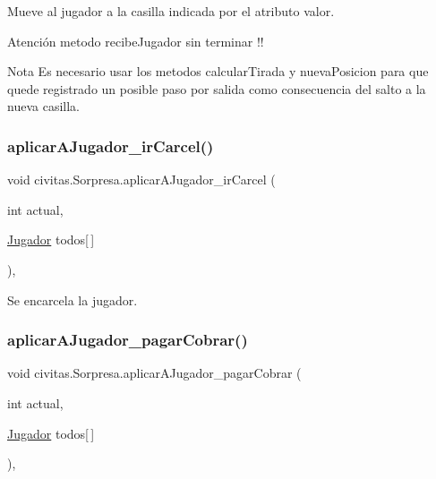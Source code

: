 Mueve al jugador a la casilla indicada por el atributo valor. \begin{DoxyWarning}{Atención}
metodo recibe\+Jugador sin terminar !! 
\end{DoxyWarning}
\begin{DoxyNote}{Nota}
Es necesario usar los metodos calcular\+Tirada y nueva\+Posicion para que quede registrado un posible paso por salida como consecuencia del salto a la nueva casilla. 
\end{DoxyNote}
\mbox{\label{classcivitas_1_1Sorpresa_a4bff9e94488f91f80b9d57bfb268669a}} 
\subsubsection{\texorpdfstring{aplicar\+A\+Jugador\+\_\+ir\+Carcel()}{aplicarAJugador\_irCarcel()}}
{\footnotesize\ttfamily void civitas.\+Sorpresa.\+aplicar\+A\+Jugador\+\_\+ir\+Carcel (\begin{DoxyParamCaption}\item[{int}]{actual,  }\item[{\hyperlink{classcivitas_1_1Jugador}{Jugador}}]{todos\mbox{[}$\,$\mbox{]} }\end{DoxyParamCaption})\hspace{0.3cm}{\ttfamily [inline]}, {\ttfamily [private]}}

Se encarcela la jugador. \mbox{\label{classcivitas_1_1Sorpresa_a2f0e2f67d53962c7aa71c4d8cddce5a6}} 
\subsubsection{\texorpdfstring{aplicar\+A\+Jugador\+\_\+pagar\+Cobrar()}{aplicarAJugador\_pagarCobrar()}}
{\footnotesize\ttfamily void civitas.\+Sorpresa.\+aplicar\+A\+Jugador\+\_\+pagar\+Cobrar (\begin{DoxyParamCaption}\item[{int}]{actual,  }\item[{\hyperlink{classcivitas_1_1Jugador}{Jugador}}]{todos\mbox{[}$\,$\mbox{]} }\end{DoxyParamCaption})\hspace{0.3cm}{\ttfamily [inline]}, {\ttfamily [private]}}

